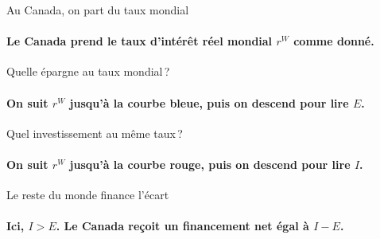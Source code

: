 \documentclass[aspectratio=169]{beamer}
\newcommand{\sThreeCapitalMarketSetup}{%
   \path[use as bounding box] (-1,-1.4) rectangle (8.95,7.05);
   \draw[HECgreen!60!black, densely dashed, line width=0.65pt]
      (0,2.4) node[left, pointlabel] {\(r^{W}\)} -- (7.7,2.4);
}
\newcommand{\sThreeCapitalMarketAxes}[1]{%
   \draw[econaxis] (0,0) -- (8,0) node[right] {\footnotesize \(#1\)};
   \draw[econaxis] (0,0) -- (0,6.55) node[above] {\(r\)};
}
\newcommand{\sThreeDomesticCapitalMarket}[1]{%
   \sThreeCapitalMarketSetup
   \ifnum#1>0
      \draw[refline] (3.1,0) node[below, pointlabel, text=HECnavy] {\(E\)} -- (3.1,2.4);
   \fi
   \ifnum#1>1
      \draw[refline] (4.9,0) node[below, pointlabel, text=HECcoral] {\(I\)} -- (4.9,2.4);
   \fi
   \draw[supply, HECnavy, line cap=round]
      (0,0.54) -- (7.35,4.95) node[right, curvelabel] {\(E\)};
   \draw[demand, HECcoral, line cap=round]
      (0,5.34) -- (7.35,0.93) node[right, curvelabel] {\(I\)};
   \ifnum#1>0
      \filldraw[eqpoint=HECnavy] (3.1,2.4) circle (2.8pt);
   \fi
   \ifnum#1>1
      \filldraw[eqpoint=HECcoral] (4.9,2.4) circle (2.8pt);
   \fi
   \ifnum#1>2
      \draw[econbrace, HECcoral] (3.1,-0.55) -- (4.9,-0.55)
         node[midway, below=7pt, pointlabel, text=HECnavy] {\(CA < 0\)};
   \fi
   \sThreeCapitalMarketAxes{E, I}
}
\begin{document}

\begin{frame}[t]{Au Canada, on part du taux mondial}
   \framesubtitle{Le Canada prend le taux d'intérêt réel mondial \(r^{W}\) comme donné.}
   \centering
\end{frame}


\begin{frame}[t]{Quelle épargne au taux mondial\,?}
   \framesubtitle{On suit \(r^{W}\) jusqu'à la courbe bleue, puis on descend pour lire \(E\).}
   \centering
\end{frame}


\begin{frame}[t]{Quel investissement au même taux\,?}
   \framesubtitle{On suit \(r^{W}\) jusqu'à la courbe rouge, puis on descend pour lire \(I\).}
   \centering
\end{frame}


\begin{frame}[t]{Le reste du monde finance l'écart}
   \framesubtitle{Ici, \(I > E\). Le Canada reçoit un financement net égal à \(I - E\).}
   \centering
\end{frame}

\end{document}

